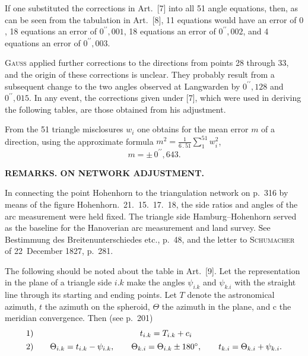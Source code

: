 \par\noindent\hspace*{\parindent}If one substituted the corrections in Art.~[7] into all 51 angle equations,
then, as can be seen from the tabulation in Art.~[8], 11 equations would
have an error of $0$, 18 equations an error of $0^{\prime\prime}{,}001$,
18 equations an error of $0^{\prime\prime}{,}002$, and 4 equations an error
of $0^{\prime\prime}{,}003$.

\par\noindent\hspace*{\parindent}\textsc{Gauss} applied further corrections to the directions from points 28
through 33, and the origin of these corrections is unclear. They probably
result from a subsequent change to the two angles observed at Langwarden
by $0^{\prime\prime}{,}128$ and $0^{\prime\prime}{,}015$. In any event, the
corrections given under [7], which were used in deriving the following
tables, are those obtained from his adjustment.

\par\noindent\hspace*{\parindent}From the 51 triangle misclosures $w_i$ one obtains for the mean error $m$
of a direction, using the approximate formula
$\displaystyle m^2=\frac{1}{6\mathbin{.}51}\sum_{1}^{51}w_i^2$,
\[
m=\pm\,0^{\prime\prime}{,}643.
\]

\clearpage
{}\hfill\textbf{REMARKS. ON NETWORK ADJUSTMENT.}
\par\medskip

\par\noindent\hspace*{\parindent}In connecting the point Hohenhorn to the triangulation network on p.~316
by means of the figure Hohenhorn.~21.~15.~17.~18, the side ratios and angles
of the arc measurement were held fixed. The triangle side Hamburg--Hohenhorn
served as the baseline for the Hanoverian arc measurement and land survey.
See Bestimmung des Breitenunterschiedes etc., p.~48, and the letter to
\textsc{Schumacher} of 22~December 1827, p.~281.

\par\noindent\hspace*{\parindent}The following should be noted about the table in Art.~[9].
Let the representation in the plane of a triangle side $i.k$ make the
angles $\psi_{i.k}$ and $\psi_{k.i}$ with the straight line through its
starting and ending points. Let $T$ denote the astronomical azimuth, $t$
the azimuth on the spheroid, $\Theta$ the azimuth in the plane, and
$\mathrm{c}$ the meridian convergence. Then (see p.~201)
\[
\begin{array}{r@{\qquad}c}
1)&t_{i.k}=T_{i.k}+c_i\\[4pt]
2)&\Theta_{i.k}=t_{i.k}-\psi_{i.k},\qquad
\Theta_{k.i}=\Theta_{i.k}\pm180^\circ,\qquad
t_{k.i}=\Theta_{k.i}+\psi_{k.i}.
\end{array}
\]

